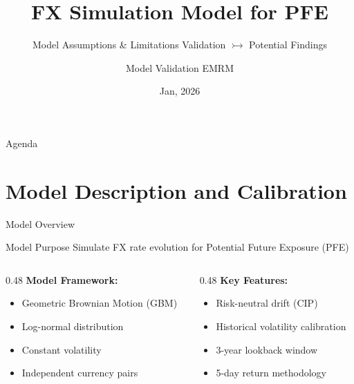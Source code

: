 \documentclass[11pt,aspectratio=169]{beamer}
\title[FX Simulation Model Validation]{FX Simulation Model for PFE}
\subtitle{Model Assumptions \& Limitations  Validation $\rightarrowtail$ Potential Findings}
\author{Model Validation EMRM}
\institute{MUFG}
\date{Jan, 2026}
\begin{document}
	
	\begin{frame}
		\titlepage
	\end{frame}
	
	\begin{frame}{Agenda}
		\tableofcontents
	\end{frame}
	
	\section{Model Description and Calibration}
	
	\begin{frame}{Model Overview}
		\begin{block}{Model Purpose}
			Simulate FX rate evolution for Potential Future Exposure (PFE) 
		\end{block}
		
		\vspace{0.3cm}
		
		\begin{columns}[T]
			\begin{column}{0.48\textwidth}
				\textbf{Model Framework:}
				\begin{itemize}
					\item Geometric Brownian Motion (GBM)
					\item Log-normal distribution
					\item Constant volatility
					\item Independent currency pairs
				\end{itemize}
			\end{column}
			
			\begin{column}{0.48\textwidth}
				\textbf{Key Features:}
				\begin{itemize}
					\item Risk-neutral drift (CIP)
					\item Historical volatility calibration
					\item 3-year lookback window
					\item 5-day return methodology
				\end{itemize}
			\end{column}
		\end{columns}
	\end{frame}
	
\end{document}
